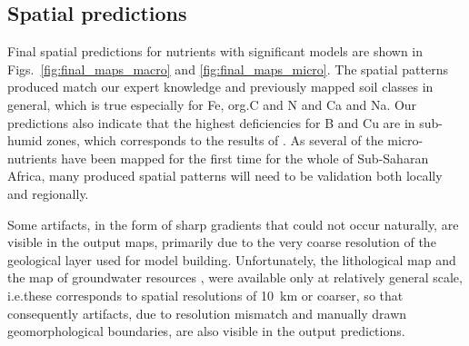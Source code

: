 \begin{linenumbers}
\subsection{Spatial predictions}

Final spatial predictions for nutrients with significant models are shown in Figs.\@~\ref{fig:final_maps_macro} and \ref{fig:final_maps_micro}. The spatial patterns produced match our expert knowledge and previously mapped soil classes in general, which is true especially for Fe, org.\@ C and N and Ca and Na. Our predictions also indicate that the highest deficiencies for B and Cu are in sub-humid zones, which corresponds to the results of \citet{Kang1985}. As several of the micro-nutrients have been mapped for the first time for the whole of Sub-Saharan Africa, many produced spatial patterns will need to be validation both locally and regionally.\par

Some artifacts, in the form of sharp gradients that could not occur naturally, are visible in the output maps, primarily due to the very coarse resolution of the geological layer used for model building. Unfortunately, the lithological map \citep{Persits1997} and the map of groundwater resources \citep{macdonald2012quantitative}, were available only at relatively general scale, i.e.\@ these corresponds to spatial resolutions of \SI{10}{\kilo\metre} or coarser, so that consequently artifacts, due to resolution mismatch and manually drawn geomorphological boundaries, are also visible in the output predictions.\par

\clearpage


\end{linenumbers}

